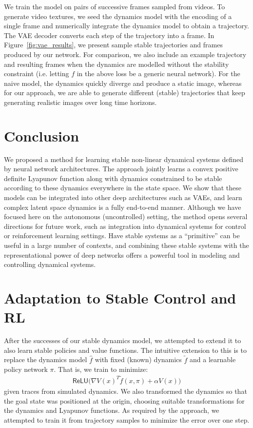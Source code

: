 We train the model on pairs of successive frames sampled from videos. To generate video textures, we seed the dynamics model with the encoding of a single frame and numerically integrate the dynamics model to obtain a trajectory. The VAE decoder converts each step of the trajectory into a frame. In Figure~\ref{fig:vae_results}, we present sample stable trajectories and frames produced by our network. For comparison, we also include an example trajectory and resulting frames when the dynamics are modelled without the stability constraint (i.e. letting $f$ in the above loss be a generic neural network).  For the naive model, the dynamics quickly diverge and produce a static image, whereas for our approach, we are able to generate different (stable) trajectories that keep generating realistic images over long time horizons.

\section{Conclusion}

We proposed a method for learning stable non-linear dynamical systems defined by neural network architectures. The approach jointly learns a convex positive definite Lyapunov function along with dynamics constrained to be stable according to these dynamics everywhere in the state space.  We show that these models can be integrated into other deep architectures such as VAEs, and learn complex latent space dynamics is a fully end-to-end manner.  Although we have focused here on the autonomous (uncontrolled) setting, the method opens several directions for future work, such as integration into dynamical systems for control or reinforcement learning settings.  Have stable systems as a ``primitive'' can be useful in a large number of contexts, and combining these stable systems with the representational power of deep networks offers a powerful tool in modeling and controlling dynamical systems.


\section{Adaptation to Stable Control and RL }

After the successes of our stable dynamics model, we attempted to extend it to also learn stable policies and value functions. The intuitive extension to this is to replace the dynamics model $\hat f$ with fixed (known) dynamics $\tilde f$ and a learnable policy network $\pi$. That is, we train to minimize:
\begin{align}
	\mathsf{ReLU}\bigl(\nabla V(x)^T \tilde{f}(x, \pi) + \alpha V (x) \bigr)
\end{align}
given traces from simulated dynamics. We also transformed the dynamics so that the goal state was positioned at the origin, choosing suitable transformations for the dynamics and Lyapunov functions. As required by the approach, we attempted to train it from trajectory samples to minimize the error over one step.


